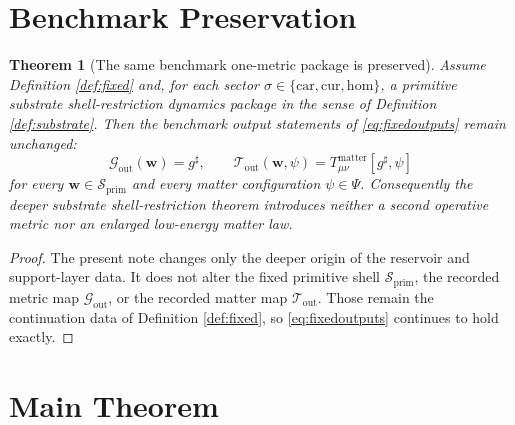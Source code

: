 \documentclass[11pt]{article}
\newcommand{\CompletedMetric}{g^{\sharp}}
\newcommand{\Car}{\mathrm{car}}
\newcommand{\Cur}{\mathrm{cur}}
\newcommand{\Hom}{\mathrm{hom}}
\newcommand{\PrimShell}{\mathcal S_{\mathrm{prim}}}
\newcommand{\MetricOut}{\mathscr G_{\mathrm{out}}}
\newcommand{\MatterOut}{\mathscr T_{\mathrm{out}}}
\newtheorem{theorem}{Theorem}
\begin{document}
\section{Benchmark Preservation}

\begin{theorem}[The same benchmark one-metric package is preserved]
\label{thm:outputs}
Assume Definition \ref{def:fixed} and, for each sector \(\sigma\in\{\Car,\Cur,\Hom\}\), a primitive substrate shell-restriction dynamics package in the sense of Definition \ref{def:substrate}. Then the benchmark output statements of \eqref{eq:fixedoutputs} remain unchanged:
\[
\MetricOut(\mathbf w)=\CompletedMetric,
\qquad
\MatterOut(\mathbf w,\psi)
=
T_{\mu\nu}^{\mathrm{matter}}[\CompletedMetric,\psi]
\]
for every \(\mathbf w\in\PrimShell\) and every matter configuration \(\psi\in\Psi\). Consequently the deeper substrate shell-restriction theorem introduces neither a second operative metric nor an enlarged low-energy matter law.
\end{theorem}

\begin{proof}
The present note changes only the deeper origin of the reservoir and support-layer data. It does not alter the fixed primitive shell \(\PrimShell\), the recorded metric map \(\MetricOut\), or the recorded matter map \(\MatterOut\). Those remain the continuation data of Definition \ref{def:fixed}, so \eqref{eq:fixedoutputs} continues to hold exactly.
\end{proof}

\section{Main Theorem}
\end{document}
